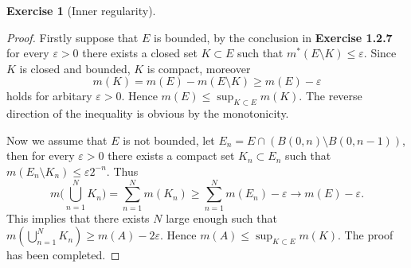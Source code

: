 \documentclass[a4paper]{article}
\newtheorem{ex}{Exercise}[subsection]
\begin{document}
\setcounter{ex}{14}
\begin{ex}[Inner regularity]\end{ex}
\begin{proof}
Firstly suppose that $E$ is bounded, by the conclusion in {\bfseries Exercise 1.2.7} for every $\varepsilon > 0$
there exists a closed set $K \subset E$ such that $m^*(E \setminus K) \leq \varepsilon$. Since $K$ is closed and
bounded, $K$ is compact, moreover$$
m(K) = m(E) - m(E \setminus K) \geq m(E) - \varepsilon
$$holds for arbitary $\varepsilon > 0$. Hence $m(E) \leq \sup_{K \subset E} m(K)$. The reverse direction of the 
inequality is obvious by the monotonicity.

Now we assume that $E$ is not bounded, let $E_n = E \cap (B(0, n) \setminus B(0, n - 1))$, then for every 
$\varepsilon > 0$ there exists a compact set $K_n \subset E_n$ such that $m(E_n \setminus K_n) \leq \varepsilon 2^{-n}$.
Thus $$
m\Big(\bigcup_{n = 1}^N K_n\Big) = \sum_{n = 1}^N m(K_n) \geq \sum_{n = 1}^N m(E_n) - \varepsilon \to m(E) - \varepsilon.
$$
This implies that there exists $N$ large enough such that $m(\bigcup_{n = 1}^N K_n) \geq m(A) - 2\varepsilon.$
Hence $m(A) \leq \sup_{K \subset E} m(K)$. The proof has been completed.
\end{proof}
\end{document}
